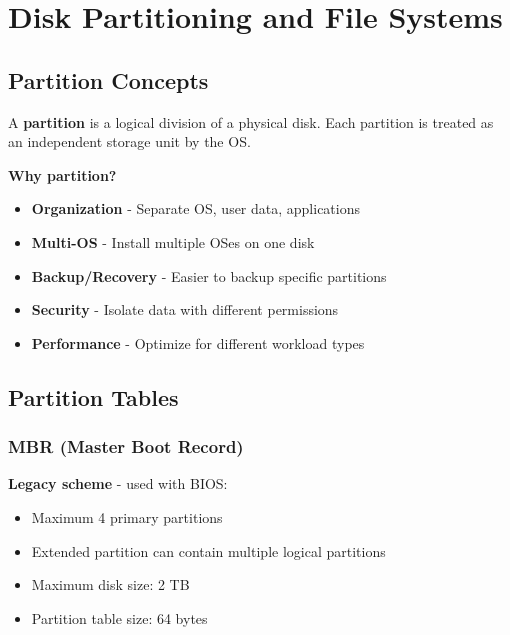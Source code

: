 
\section{Disk Partitioning and File Systems}
\label{sec:disk-partitioning}

\subsection{Partition Concepts}

A \textbf{partition} is a logical division of a physical disk. Each partition is treated as an independent storage unit by the OS.

\textbf{Why partition?}
\begin{itemize}
    \item \textbf{Organization} - Separate OS, user data, applications
    \item \textbf{Multi-OS} - Install multiple OSes on one disk
    \item \textbf{Backup/Recovery} - Easier to backup specific partitions
    \item \textbf{Security} - Isolate data with different permissions
    \item \textbf{Performance} - Optimize for different workload types
\end{itemize}

\subsection{Partition Tables}

\subsubsection{MBR (Master Boot Record)}

\textbf{Legacy scheme} - used with BIOS:
\begin{itemize}
    \item Maximum 4 primary partitions
    \item Extended partition can contain multiple logical partitions
    \item Maximum disk size: 2 TB
    \item Partition table size: 64 bytes
\end{itemize}

